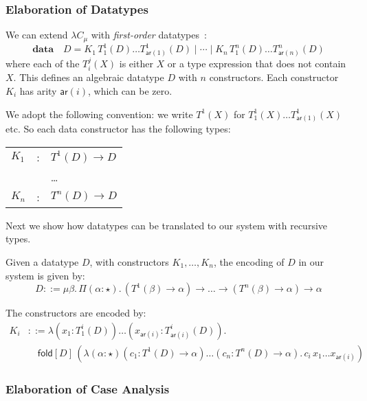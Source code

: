 \documentclass[oneside,a4paper]{article}
\theoremstyle{break}
\renewcommand{\arraystretch}{2.5}
\newcommand{\fold}[2]{\mathsf{fold}[#1]\,#2}
\begin{document}
\subsubsection{Elaboration of Datatypes}

We can extend $\lambda C_{\mu}$ with \emph{first-order}
datatypes~\cite{geuvers2014church}:
\[
  \mathbf{data} \quad D = K_{1}\,T_{1}^{1}(D) \dots
  T_{\mathsf{ar}(1)}^{1}(D) \mid \cdots \mid K_{n}\,T_{1}^{n}(D) \dots
  T_{\mathsf{ar}(n)}^{n}(D)
\]
where each of the $T_{i}^{j}(X)$ is either $X$ or a type expression
that does not contain $X$. This defines an algebraic datatype $D$ with
$n$ constructors. Each constructor $K_{i}$ has arity $\mathsf{ar}(i)$,
which can be zero.

We adopt the following convention: we write $T^{1}(X)$ for
$T_{1}^{1}(X) \dots T_{\mathsf{ar}(1)}^{1}(X)$ etc. So each data
constructor has the following types:
\begingroup
\renewcommand*{\arraystretch}{1.0}
\begin{table}[h]
  \centering
  \begin{tabular}{lll}
    $K_{1}$ &:& $T^{1}(D) \rightarrow D$ \\
            && \dots \\
    $K_{n}$ &:& $T^{n}(D) \rightarrow D$
  \end{tabular}
\end{table}
\endgroup

Next we show how datatypes can be translated to our system with
recursive types.

Given a datatype $D$, with constructors $K_{1},\dots,K_{n}$, the
encoding of $D$ in our system is given by:
\[
  D ::= \mu \beta.\,\Pi(\alpha : \star).\,(T^{1}(\beta) \rightarrow
  \alpha) \rightarrow \dots \rightarrow (T^{n}(\beta) \rightarrow
  \alpha) \rightarrow \alpha
\]

The constructors are encoded by:
\begin{align*}
  K_{i} &::= \lambda(x_{1}:T_{1}^{i}(D))\dots(x_{\mathsf{ar}(i)}:T_{\mathsf{ar}(i)}^{i}(D)).\\
        &\quad \fold{D}{(\lambda(\alpha:\star)(c_{1}:T^{1}(D) \rightarrow \alpha)\dots(c_{n}:T^{n}(D) \rightarrow \alpha).\,c_{i}\,x_{1} \dots x_{\mathsf{ar}(i)})}
\end{align*}

\subsubsection{Elaboration of Case Analysis}
\end{document}
